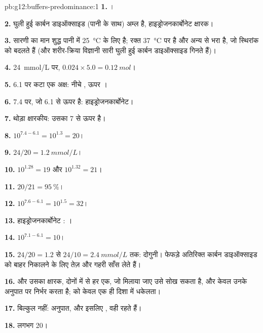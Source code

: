 \begin{solution}{pb:g12:buffers-predominance:1}
\textbf{1.} ।

\textbf{2.} घुली हुई कार्बन डाइऑक्साइड (पानी के साथ) अम्ल है,
हाइड्रोजनकार्बोनेट क्षारक।

\textbf{3.} सारणी का मान शुद्ध पानी में \qty{25}{\celsius} के लिए है;
रक्त \qty{37}{\celsius} पर है और अन्य  से भरा है, जो
स्थिरांक को बदलते हैं (और शरीर-क्रिया विज्ञानी सारी घुली हुई कार्बन डाइऑक्साइड गिनते हैं)।

\textbf{4.} \qty{24}{mmol/L} पर, $0.024 \times 5.0 = \qty{0.12}{mol}$।

\textbf{5.} 6.1 पर कटा एक  अक्ष: नीचे , ऊपर ।

\textbf{6.} 7.4 पर, जो 6.1 से ऊपर है: हाइड्रोजनकार्बोनेट।

\textbf{7.} थोड़ा क्षारकीय: उसका  7 से ऊपर है।

\textbf{8.} $10^{7.4 - 6.1} = 10^{1.3} = 20$।

\textbf{9.} $24 / 20 = \qty{1.2}{mmol/L}$।

\textbf{10.} $10^{1.28} = 19$ और $10^{1.32} = 21$।

\textbf{11.} $20/21 = \qty{95}{\percent}$।

\textbf{12.} $10^{7.6 - 6.1} = 10^{1.5} = 32$।

\textbf{13.} हाइड्रोजनकार्बोनेट :
।

\textbf{14.} $10^{7.1 - 6.1} = 10$।

\textbf{15.} $24/20 = 1.2$ से $24/10 = \qty{2.4}{mmol/L}$ तक: दोगुनी।
फेफड़े अतिरिक्त कार्बन डाइऑक्साइड को बाहर निकालने के लिए
तेज़ और गहरी साँस लेते हैं।

\textbf{16.}  और उसका क्षारक, दोनों में से हर एक, जो मिलाया जाए उसे सोख सकता है, और
 केवल उनके अनुपात पर निर्भर करता है;   को केवल
एक ही दिशा में धकेलता।

\textbf{17.} बिल्कुल नहीं: अनुपात, और इसलिए , वही रहते हैं।

\textbf{18.} लगभग 20।
\end{solution}
